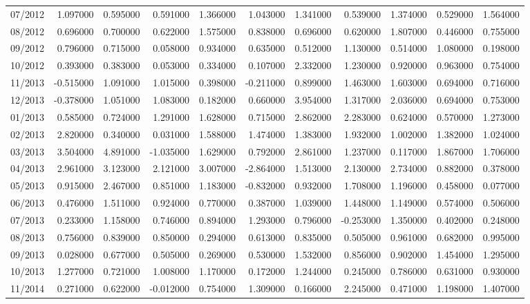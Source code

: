 \begin{tabular}{lrrrrrrrrrr}
07/2012 & 1.097000 & 0.595000 & 0.591000 & 1.366000 & 1.043000 & 1.341000 & 0.539000 & 1.374000 & 0.529000 & 1.564000 \\
08/2012 & 0.696000 & 0.700000 & 0.622000 & 1.575000 & 0.838000 & 0.696000 & 0.620000 & 1.807000 & 0.446000 & 0.755000 \\
09/2012 & 0.796000 & 0.715000 & 0.058000 & 0.934000 & 0.635000 & 0.512000 & 1.130000 & 0.514000 & 1.080000 & 0.198000 \\
10/2012 & 0.393000 & 0.383000 & 0.053000 & 0.334000 & 0.107000 & 2.332000 & 1.230000 & 0.920000 & 0.963000 & 0.754000 \\
11/2013 & -0.515000 & 1.091000 & 1.015000 & 0.398000 & -0.211000 & 0.899000 & 1.463000 & 1.603000 & 0.694000 & 0.716000 \\
12/2013 & -0.378000 & 1.051000 & 1.083000 & 0.182000 & 0.660000 & 3.954000 & 1.317000 & 2.036000 & 0.694000 & 0.753000 \\
01/2013 & 0.585000 & 0.724000 & 1.291000 & 1.628000 & 0.715000 & 2.862000 & 2.283000 & 0.624000 & 0.570000 & 1.273000 \\
02/2013 & 2.820000 & 0.340000 & 0.031000 & 1.588000 & 1.474000 & 1.383000 & 1.932000 & 1.002000 & 1.382000 & 1.024000 \\
03/2013 & 3.504000 & 4.891000 & -1.035000 & 1.629000 & 0.792000 & 2.861000 & 1.237000 & 0.117000 & 1.867000 & 1.706000 \\
04/2013 & 2.961000 & 3.123000 & 2.121000 & 3.007000 & -2.864000 & 1.513000 & 2.130000 & 2.734000 & 0.882000 & 0.378000 \\
05/2013 & 0.915000 & 2.467000 & 0.851000 & 1.183000 & -0.832000 & 0.932000 & 1.708000 & 1.196000 & 0.458000 & 0.077000 \\
06/2013 & 0.476000 & 1.511000 & 0.924000 & 0.770000 & 0.387000 & 1.039000 & 1.448000 & 1.149000 & 0.574000 & 0.506000 \\
07/2013 & 0.233000 & 1.158000 & 0.746000 & 0.894000 & 1.293000 & 0.796000 & -0.253000 & 1.350000 & 0.402000 & 0.248000 \\
08/2013 & 0.756000 & 0.839000 & 0.850000 & 0.294000 & 0.613000 & 0.835000 & 0.505000 & 0.961000 & 0.682000 & 0.995000 \\
09/2013 & 0.028000 & 0.677000 & 0.505000 & 0.269000 & 0.530000 & 1.532000 & 0.856000 & 0.902000 & 1.454000 & 1.295000 \\
10/2013 & 1.277000 & 0.721000 & 1.008000 & 1.170000 & 0.172000 & 1.244000 & 0.245000 & 0.786000 & 0.631000 & 0.930000 \\
11/2014 & 0.271000 & 0.622000 & -0.012000 & 0.754000 & 1.309000 & 0.166000 & 2.245000 & 0.471000 & 1.198000 & 1.407000 \\

\end{tabular}
